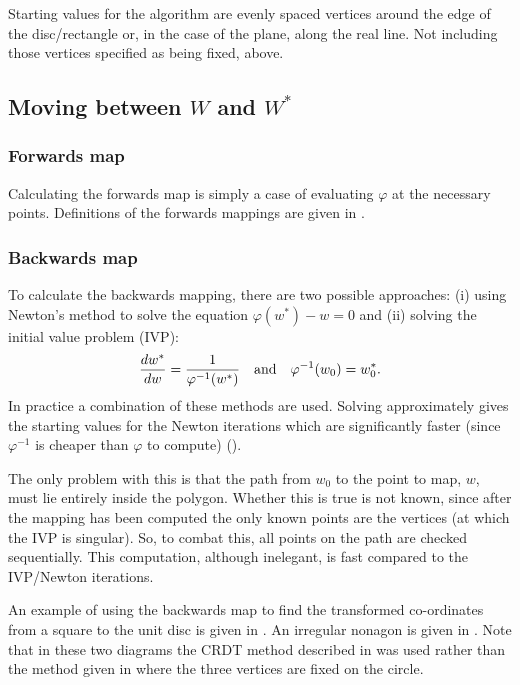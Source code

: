 Starting values for the algorithm are evenly spaced vertices around the edge of the disc/rectangle or, in the case of the plane, along the real line. Not including those vertices specified as being fixed, above.

\subsection{Moving between $W$ and $W^*$}

\subsubsection{Forwards map}

Calculating the forwards map is simply a case of evaluating $\varphi$ at the necessary points. Definitions of the forwards mappings are given in .

\subsubsection{Backwards map}
\label{sc-backwardsmap}

To calculate the backwards mapping, there are two possible approaches: (i) using Newton's method to solve the equation $\varphi(w^*)-w=0$ and (ii) solving the initial value problem (IVP):
\begin{equation}
\label{scivp}
\frac{dw^*}{dw}=\frac{1}{\varphi^{-1}(w^*)} \quad \text{and} \quad \varphi^{-1}(w_0)=w^*_0.
\end{equation}
In practice a combination of these methods are used. Solving  approximately gives the starting values for the Newton iterations which are significantly faster (since $\varphi^{-1}$ is cheaper than $\varphi$ to compute) (\cite[p. 29]{driscoll}).

The only problem with this is that the path from $w_0$ to the point to map, $w$, must lie entirely inside the polygon. Whether this is true is not known, since after the mapping has been computed the only known points are the vertices (at which the IVP is singular). So, to combat this, all points on the path are checked sequentially. This computation, although inelegant, is fast compared to the IVP/Newton iterations.

An example of using the backwards map to find the transformed co-ordinates from a square to the unit disc is given in . An irregular nonagon is given in . Note that in these two diagrams the CRDT method described in  was used rather than the method given in  where the three vertices are fixed on the circle.


